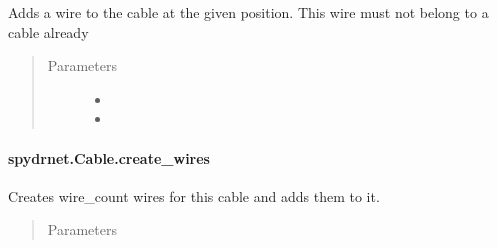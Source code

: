 \documentclass[letterpaper,10pt,english,openany,oneside]{sphinxmanual}
\begin{document}
\begin{fulllineitems}
\label{\detokenize{reference/classes/generated/spydrnet.Cable.add_wire:spydrnet.Cable.add_wire}}
Adds a wire to the cable at the given position. This wire must not belong to a cable already
\begin{quote}\begin{description}
\item[{Parameters}] \leavevmode\begin{itemize}
\item {} 

\item {} 

\end{itemize}

\end{description}\end{quote}

\end{fulllineitems}



\paragraph{spydrnet.Cable.create\_wires}
\label{\detokenize{reference/classes/generated/spydrnet.Cable.create_wires:spydrnet-cable-create-wires}}\label{\detokenize{reference/classes/generated/spydrnet.Cable.create_wires::doc}}

\begin{fulllineitems}
\label{\detokenize{reference/classes/generated/spydrnet.Cable.create_wires:spydrnet.Cable.create_wires}}
Creates wire\_count wires for this cable and adds them to it.
\begin{quote}\begin{description}
\item[{Parameters}] \leavevmode
{}

\end{description}\end{quote}

\end{fulllineitems}
\end{document}
